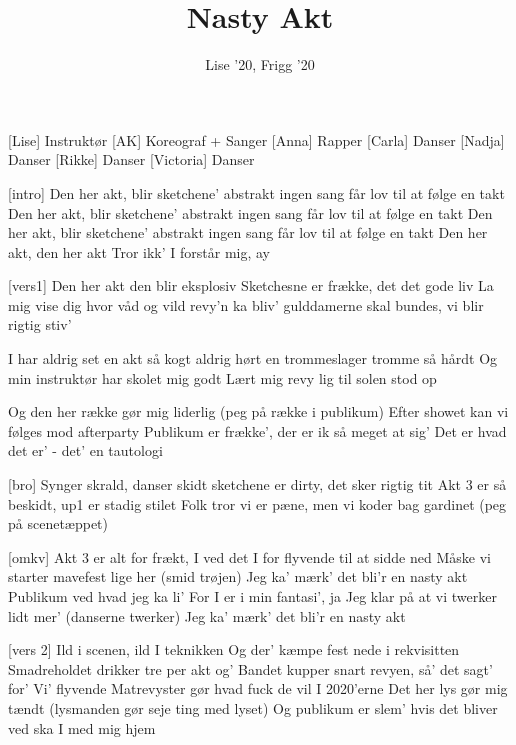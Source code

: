 \documentclass[a4paper,11pt]{article}
\title{Nasty Akt}
\author{Lise '20, Frigg '20}
\begin{document}
\maketitle

\begin{roles}
[Lise] Instruktør
[AK] Koreograf + Sanger
[Anna] Rapper
[Carla] Danser
[Nadja] Danser
[Rikke] Danser
[Victoria] Danser
\end{roles}



\begin{song}
[intro]
Den her akt, blir sketchene' abstrakt
ingen sang får lov til at følge en takt
Den her akt, blir sketchene' abstrakt
ingen sang får lov til at følge en takt
Den her akt, blir sketchene' abstrakt
ingen sang får lov til at følge en takt
Den her akt, den her akt
Tror ikk' I forstår mig, ay

[vers1]
Den her akt den blir eksplosiv
Sketchesne er frække, det det gode liv
La mig vise dig hvor våd og vild revy'n ka bliv'
gulddamerne skal bundes, vi blir rigtig stiv'

I har aldrig set en akt så kogt
aldrig hørt en trommeslager tromme så hårdt
Og min instruktør har skolet mig godt
Lært mig revy lig til solen stod op

Og den her række gør mig liderlig (peg på række i publikum)
Efter showet kan vi følges mod afterparty
Publikum er frække', der er ik så meget at sig'
Det er hvad det er' - det' en tautologi

[bro]
Synger skrald, danser skidt
sketchene er dirty, det sker rigtig tit
Akt 3 er så beskidt, up1 er stadig stilet
Folk tror vi er pæne, men vi koder bag gardinet (peg på scenetæppet)

[omkv]
Akt 3 er alt for frækt, I ved det
I for flyvende til at sidde ned
Måske vi starter mavefest lige her (smid trøjen)
Jeg ka' mærk' det bli'r en nasty akt
Publikum ved hvad jeg ka li'
For I er i min fantasi', ja
Jeg klar på at vi twerker lidt mer' (danserne twerker)
Jeg ka' mærk' det bli'r en nasty akt

[vers 2]
Ild i scenen, ild I teknikken
Og der' kæmpe fest nede i rekvisitten
Smadreholdet drikker tre per akt og'
Bandet kupper snart revyen, så' det sagt' for'
Vi' flyvende
Matrevyster gør hvad fuck de vil I 2020'erne
Det her lys gør mig tændt (lysmanden gør seje ting med lyset)
Og publikum er slem'
hvis det bliver ved ska I med mig hjem


\end{song}
\end{document}
